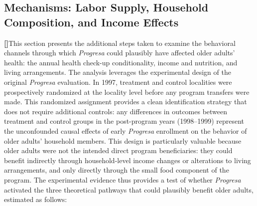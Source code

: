 \documentclass[12pt]{article}
\newcounter{paragraphnum}
\newcommand{\p}{\refstepcounter{paragraphnum}\textbf{[\theparagraphnum]}\enspace}
\begin{document}

\subsection{Mechanisms: Labor Supply, Household Composition, and Income Effects}\label{s:mechanisms}

\p This section presents the additional steps taken to examine the behavioral channels through which \textit{Progresa} could plausibly have affected older adults' health: the annual health check-up conditionality, income and nutrition, and living arrangements. The analysis leverages the experimental design of the original \textit{Progresa} evaluation. In 1997, treatment and control localities were prospectively randomized at the locality level before any program transfers were made. This randomized assignment provides a clean identification strategy that does not require additional controls: any differences in outcomes between treatment and control groups in the post-program years (1998--1999) represent the unconfounded causal effects of early \textit{Progresa} enrollment on the behavior of older adults' household members. This design is particularly valuable because older adults were not the intended direct program beneficiaries: they could benefit indirectly through household-level income changes or alterations to living arrangements, and only directly through the small food component of the program. The experimental evidence thus provides a test of whether \textit{Progresa} activated the three theoretical pathways that could plausibly benefit older adults, estimated as follows:
\end{document}
